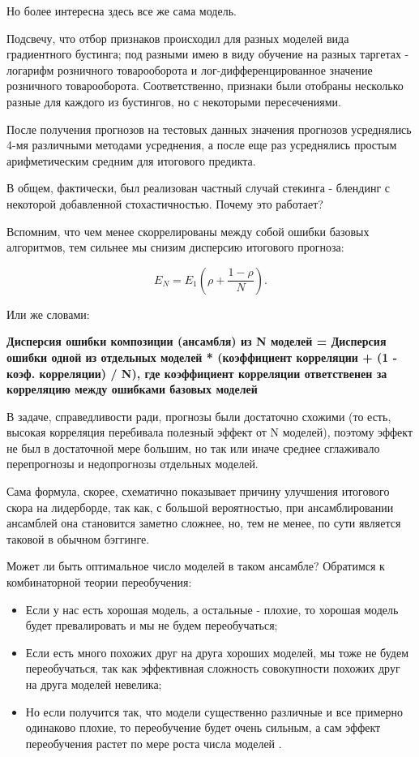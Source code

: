 \documentclass[12pt, a4paper]{article}
\begin{document}
Но более интересна здесь все же сама модель.

Подсвечу, что отбор признаков происходил для разных моделей вида градиентного бустинга;
под разными имею в виду обучение на разных таргетах - логарифм розничного товарооборота и лог-дифференцированное значение розничного товарооборота.
Соответственно, признаки были отобраны несколько разные для каждого из бустингов, но с некоторыми пересечениями.

После получения прогнозов на тестовых данных значения прогнозов усреднялись 4-мя различными методами усреднения, а после еще раз усреднялись
простым арифметическим средним для итогового предикта.

В общем, фактически, был реализован частный случай стекинга - блендинг с некоторой добавленной стохастичностью. Почему это работает?

Вспомним, что чем менее скоррелированы между собой ошибки базовых алгоритмов, тем сильнее мы снизим дисперсию итогового прогноза:

\[
E_N = E_1\left(\rho + \frac{1-\rho}{N}\right).
\]

Или же словами:

\textbf{Дисперсия ошибки композиции (ансамбля) из N моделей = Дисперсия ошибки одной из отдельных моделей *
(коэффициент корреляции + (1 - коэф. корреляции) / N), где коэффициент корреляции ответственен за корреляцию между
ошибками базовых моделей}

В задаче, справедливости ради, прогнозы были достаточно схожими
(то есть, высокая корреляция перебивала полезный эффект от N моделей), поэтому эффект не был в достаточной мере большим,
но так или иначе среднее сглаживало перепрогнозы и недопрогнозы отдельных моделей.

Сама формула, скорее, схематично показывает причину улучшения итогового скора на лидерборде, так как,
с большой вероятностью, при ансамблировании ансамблей она становится заметно сложнее, но, тем не менее, по сути является таковой в обычном бэггинге.

Может ли быть оптимальное число моделей в таком ансамбле? Обратимся к комбинаторной теории переобучения:

\begin{itemize}\item Если у нас есть хорошая модель, а остальные - плохие, то хорошая модель будет превалировать и мы не будем переобучаться;

\item Если есть много похожих друг на друга хороших моделей, мы тоже не будем переобучаться, так как эффективная сложность
совокупности похожих друг на друга моделей невелика;

\item Но если получится так, что модели существенно различные и
все примерно одинаково плохие, то переобучение будет очень сильным, а сам эффект переобучения растет по мере роста числа моделей \cite{vorontsov2016}.
\end{itemize}
\end{document}
